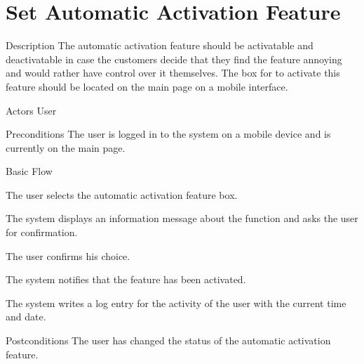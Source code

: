 \section{Set Automatic Activation Feature}

%
\begin{cpart}{Description}
The automatic activation feature should be activatable and deactivatable in case the customers decide that they find the feature annoying and would rather have control over it themselves. The box for to activate this feature should be located on the main page on a mobile interface.
\end{cpart}


%
\begin{cpart}{Actors}
User
\end{cpart}

%
\begin{cpart}{Preconditions}
The user is logged in to the system on a mobile device and is currently on the main page.
\end{cpart}

%
\begin{cpartList}{Basic Flow}
  \item The user selects the automatic activation feature box.
  \item The system displays an information message about the function and asks the user for confirmation.
  \item The user confirms his choice.
  \item The system notifies that the feature has been activated.
  \item The system writes a log entry for the activity of the user with the current time and date.
\end{cpartList}

\begin{cpart}{Postconditions}
The user has changed the status of the automatic activation feature.
\end{cpart}
